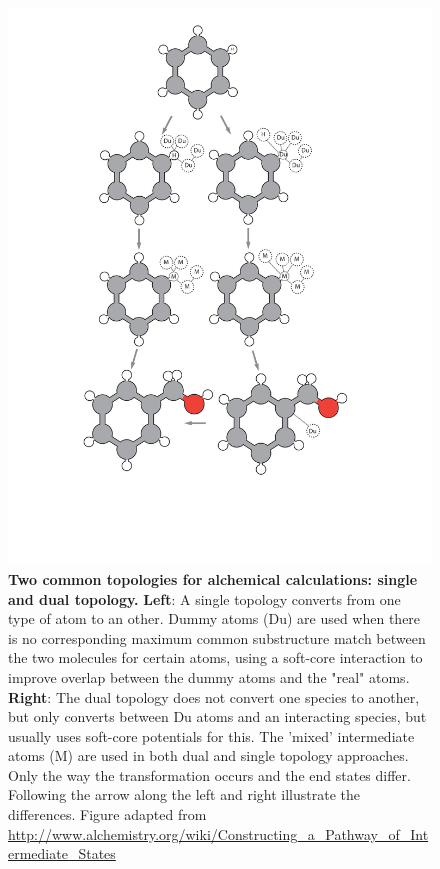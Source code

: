 \documentclass[9pt,bestpractices,pubversion]{livecoms}
\begin{document}
\begin{figure}
    \includegraphics[width=0.95\columnwidth]{figures/fig3_topol/Figure.pdf}
    \caption{\textbf{Two common topologies for alchemical calculations: single and dual topology.} \textbf{Left}: A single topology converts from one type of atom to an other. Dummy atoms (Du) are used when there is no corresponding maximum common substructure match between the two molecules for certain atoms, using a soft-core interaction to improve overlap between the dummy atoms and the "real" atoms.  \textbf{Right}: The dual topology does not convert one species to another, but only converts between Du atoms and an interacting species, but usually uses soft-core potentials for this. The 'mixed' intermediate atoms (M) are used in both dual and single topology approaches. Only the way the transformation occurs and the end states differ. Following the arrow along the left and right illustrate the differences. Figure adapted from \url{http://www.alchemistry.org/wiki/Constructing_a_Pathway_of_Intermediate_States}}
    \label{fig:fig_topology}
\end{figure} 
\end{document}
